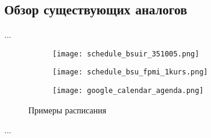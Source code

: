 \subsection{Обзор существующих аналогов}
\label{sec:analysis:analogues}

...

\begin{sidewaysfigure}
\centering
	\begin{subfigure}[b]{0.3\textwidth}
	    \centering
		\texttt{[image: schedule\_bsuir\_351005.png]} 
		\caption{}
		\label{fig:analysis:analogues:bsuir}
	\end{subfigure}
	\begin{subfigure}[b]{0.3\textwidth}
	    \centering
		\texttt{[image: schedule\_bsu\_fpmi\_1kurs.png]}
		\caption{}
		\label{fig:analysis:analogues:bsu_fpmi}
	\end{subfigure}
	\begin{subfigure}[b]{0.3\textwidth}
	    \centering
		\texttt{[image: google\_calendar\_agenda.png]} 
		\caption{}
		\label{fig:analysis:analogues:google_calendar}
	\end{subfigure}
	\caption{Примеры расписания}
\end{sidewaysfigure}

...